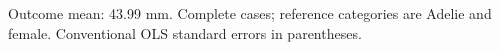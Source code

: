 Outcome mean: 43.99 mm. Complete cases; reference categories are Adelie and female. Conventional OLS standard errors in parentheses.